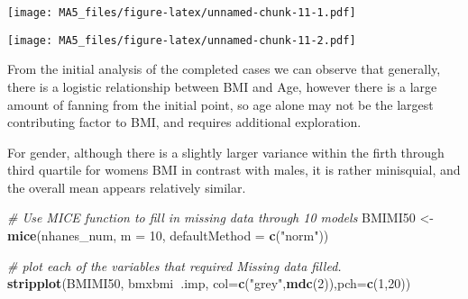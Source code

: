 \documentclass[]{article}
\newenvironment{Shaded}{\begin{snugshade}}{\end{snugshade}}
\newcommand{\KeywordTok}[1]{\textcolor[rgb]{0.13,0.29,0.53}{\textbf{#1}}}
\newcommand{\DataTypeTok}[1]{\textcolor[rgb]{0.13,0.29,0.53}{#1}}
\newcommand{\DecValTok}[1]{\textcolor[rgb]{0.00,0.00,0.81}{#1}}
\newcommand{\StringTok}[1]{\textcolor[rgb]{0.31,0.60,0.02}{#1}}
\newcommand{\CommentTok}[1]{\textcolor[rgb]{0.56,0.35,0.01}{\textit{#1}}}
\newcommand{\OperatorTok}[1]{\textcolor[rgb]{0.81,0.36,0.00}{\textbf{#1}}}
\newcommand{\NormalTok}[1]{#1}
\begin{document}
\texttt{[image: MA5\_files/figure-latex/unnamed-chunk-11-1.pdf]}

\begin{Shaded}
\end{Shaded}

\texttt{[image: MA5\_files/figure-latex/unnamed-chunk-11-2.pdf]}

From the initial analysis of the completed cases we can observe that
generally, there is a logistic relationship between BMI and Age, however
there is a large amount of fanning from the initial point, so age alone
may not be the largest contributing factor to BMI, and requires
additional exploration.

For gender, although there is a slightly larger variance within the
firth through third quartile for womens BMI in contrast with males, it
is rather minisquial, and the overall mean appears relatively similar.

\begin{Shaded}
\begin{Highlighting}[]
\CommentTok{# Use MICE function to fill in missing data through 10 models}
\NormalTok{BMIMI50 <-}\StringTok{ }\KeywordTok{mice}\NormalTok{(nhanes_num, }\DataTypeTok{m =} \DecValTok{10}\NormalTok{, }\DataTypeTok{defaultMethod =} \KeywordTok{c}\NormalTok{(}\StringTok{"norm"}\NormalTok{))}
\end{Highlighting}
\end{Shaded}

\begin{Shaded}
\begin{Highlighting}[]
\CommentTok{# plot each of the variables that required Missing data filled.}
\KeywordTok{stripplot}\NormalTok{(BMIMI50, bmxbmi}\OperatorTok{~}\NormalTok{.imp, }\DataTypeTok{col=}\KeywordTok{c}\NormalTok{(}\StringTok{"grey"}\NormalTok{,}\KeywordTok{mdc}\NormalTok{(}\DecValTok{2}\NormalTok{)),}\DataTypeTok{pch=}\KeywordTok{c}\NormalTok{(}\DecValTok{1}\NormalTok{,}\DecValTok{20}\NormalTok{))}
\end{Highlighting}
\end{Shaded}
\end{document}
